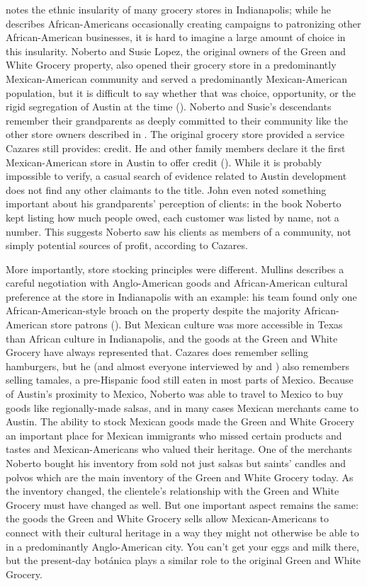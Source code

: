 \textcite{mullins} notes the ethnic insularity of many grocery stores in Indianapolis; while he describes African-Americans occasionally creating campaigns to patronizing other African-American businesses, it is hard to imagine a large amount of choice in this insularity. Noberto and Susie Lopez, the original owners of the Green and White Grocery property, also opened their grocery store in a predominantly Mexican-American community and served a predominantly Mexican-American population, but it is difficult to say whether that was choice, opportunity, or the rigid segregation of Austin at the time (\cite{hernandez}).
Noberto and Susie's descendants remember their grandparents as deeply committed to their community like the other store owners described in \textcite{mullins}. The original grocery store provided a service Cazares still provides: credit. He and other family members declare it the first Mexican-American store in Austin to offer credit (\cite{lepe}). While it is probably impossible to verify, a casual search of evidence related to Austin development does not find any other claimants to the title. John even noted something important about his grandparents' perception of clients: in the book Noberto kept listing how much people owed, each customer was listed by name, not a number. This suggests Noberto saw his clients as members of a community, not simply potential sources of profit, according to Cazares.


More importantly, store stocking principles were different. Mullins describes a careful negotiation with Anglo-American goods and African-American cultural preference at the store in Indianapolis with an example: his team found only one African-American-style broach on the property despite the majority African-American store patrons (\cite[92]{mullins}). But Mexican culture was more accessible in Texas than African culture in Indianapolis, and the goods at the Green and White Grocery have always represented that. Cazares does remember selling hamburgers, but he 
(and almost everyone interviewed by \textcite[75-76]{lepe} and \textcite{gandara}) 
also remembers selling tamales, a pre-Hispanic food still eaten in most parts of Mexico. Because of Austin's proximity to Mexico, Noberto was able to travel to Mexico to buy goods like regionally-made salsas, and in many cases Mexican merchants came to Austin. The ability to stock Mexican goods made the Green and White Grocery an important place for Mexican immigrants who missed certain products and tastes and Mexican-Americans who valued their heritage. One of the merchants Noberto bought his inventory from sold not just salsas but saints’ candles and polvos which are the main inventory of the Green and White Grocery today. As the inventory changed, the clientele's relationship with the Green and White Grocery must have changed as well. But one important aspect remains the same: the goods the Green and White Grocery sells allow Mexican-Americans to connect with their cultural heritage in a way they might not otherwise be able to in a predominantly Anglo-American city. You can't get your eggs and milk there, but the present-day botánica plays a similar role to the original Green and White Grocery.

